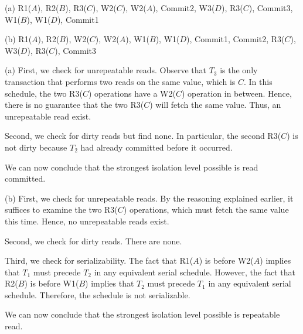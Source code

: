 \vgap

(a) R1($A$), R2($B$), R3($C$), W2($C$), W2($A$), Commit2, W3($D$), R3($C$), Commit3, W1($B$), W1($D$), Commit1

\vgap

(b) R1($A$), R2($B$), W2($C$), W2($A$), W1($B$), W1($D$), Commit1, Commit2, R3($C$), W3($D$), R3($C$), Commit3

\begin{sol}
     (a) First, we check for unrepeatable reads. Observe that $T_3$ is the only transaction that performs two reads on the same value, which is $C$. In this schedule, the two R3($C$) operations have a W2($C$) operation in between. Hence, there is no guarantee that the two R3($C$) will fetch the same value. Thus, an unrepeatable read exist.

    \vgap

    Second, we check for dirty reads but find none. In particular, the second R3($C$) is not dirty because $T_2$ had already committed before it occurred.

    \vgap

    We can now conclude that the strongest isolation level possible is read committed.

    \vgap

   (b) First, we check for unrepeatable reads. By the reasoning explained earlier, it suffices to examine the two R3($C$) operations, which must fetch the same value this time. Hence, no unrepeatable reads exist.

   \vgap

   Second, we check for dirty reads. There are none.

   \vgap

   Third, we check for serializability. The fact that R1($A$) is before W2($A$) implies that $T_1$ must precede $T_2$ in any equivalent serial schedule. However, the fact that R2($B$) is before W1($B$) implies that $T_2$ must precede $T_1$ in any equivalent serial schedule. Therefore, the schedule is not serializable.

   \vgap

   We can now conclude that the strongest isolation level possible is repeatable read.


\end{sol}



%

